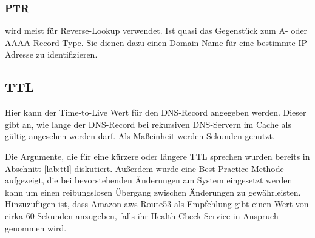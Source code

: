 \subsubsection{PTR}
wird meist für Reverse-Lookup verwendet. Ist quasi das Gegenstück zum A- oder AAAA-Record-Type. Sie dienen dazu einen Domain-Name für eine bestimmte IP-Adresse zu identifizieren.

\subsection{TTL}
Hier kann der Time-to-Live Wert für den DNS-Record angegeben werden. Dieser gibt an, wie lange der DNS-Record bei rekursiven DNS-Servern im Cache als gültig angesehen werden darf. Als Maßeinheit werden Sekunden genutzt. 

Die Argumente, die für eine kürzere oder längere TTL sprechen wurden bereits in Abschnitt \ref{lab:ttl} diskutiert. Außerdem wurde eine Best-Practice Methode aufgezeigt, die bei bevorstehenden Änderungen am System eingesetzt werden kann um einen reibungslosen Übergang zwischen Änderungen zu gewährleisten. Hinzuzufügen ist, dass Amazon aws Route53 als Empfehlung gibt einen Wert von cirka 60 Sekunden anzugeben, falls ihr Health-Check Service in Anspruch genommen wird.
